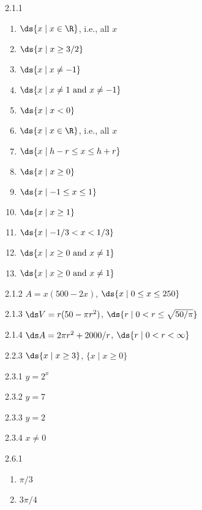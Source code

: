 \begin{Answer}{2.1.1}
\begin{enumerate}
	\item	$\ds \{x\mid x\in \R\}$, i.e., all $x$
	\item	$\ds \{x\mid x\ge 3/2\}$
	\item	$\ds \{x\mid x\not=-1\}$
	\item	$\ds \{x\mid x\not=1 \hbox{ and } x\not=-1\}$
	\item	$\ds \{x\mid x<0\}$
	\item	$\ds \{x\mid x\in \R\}$, i.e., all $x$
	\item	$\ds \{x\mid h-r\le x\le h+r\}$
	\item	$\ds \{x\mid x\ge0\}$
	\item	$\ds \{x\mid -1\le x\le 1\}$
	\item	$\ds \{x\mid x\ge 1\}$
	\item	$\ds \{x\mid -1/3< x< 1/3\}$
	\item	$\ds \{x\mid x\ge0  \hbox{ and } x\not=1\}$
	\item	$\ds \{x\mid x\ge0  \hbox{ and } x\not=1\}$
\end{enumerate}
\end{Answer}
\begin{Answer}{2.1.2}
$A=x(500-2x)$, $\ds \{x\mid 0\le x\le 250\}$
\end{Answer}
\begin{Answer}{2.1.3}
$\ds V=r(50-\pi r^2)$, $\ds \{r\mid 0< r\le \sqrt{50/\pi}\}$
\end{Answer}
\begin{Answer}{2.1.4}
$\ds A=2\pi r^2+2000/r$, $\ds \{r\mid 0<r<\infty\}$
\end{Answer}
\begin{Answer}{2.2.3}
$\ds \{x\mid x\ge3\}$, $\{x\mid x\ge0\}$
\end{Answer}
\begin{Answer}{2.3.1}
$y=2^x$
\end{Answer}
\begin{Answer}{2.3.2}
$y=7$
\end{Answer}
\begin{Answer}{2.3.3}
$y=2$
\end{Answer}
\begin{Answer}{2.3.4}
$x\neq 0$
\end{Answer}
\begin{Answer}{2.6.1}
\begin{enumerate}
	\item	$\pi/3$
	\item	$3\pi/4$
\end{enumerate}
\end{Answer}
